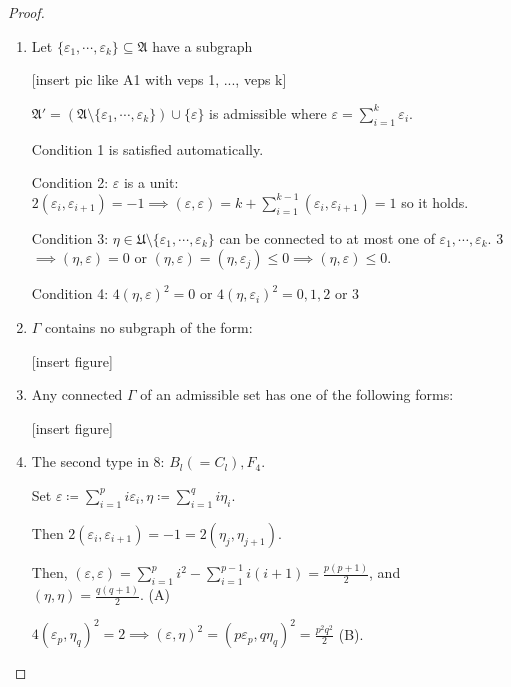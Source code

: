 \documentclass{article}
\theoremstyle{definition}
\begin{document}
\begin{proof}
\begin{enumerate}[label=\arabic*)]
        \item Let \(\{ \varepsilon_1, \cdots , \varepsilon_k \} \subseteq \mathfrak{A}\) have a subgraph
            
        [insert pic like A1 with veps 1, ..., veps k]

        \(\mathfrak{A}'= (\mathfrak{A} \setminus \{ \varepsilon_1, \cdots , \varepsilon_k \}) \cup \{ \varepsilon \}\) is admissible where \(\varepsilon = \sum_{i=1}^k \varepsilon_i\). 
            
        Condition 1 is satisfied automatically.

        Condition 2: \(\varepsilon\) is a unit: \(2 (\varepsilon_i, \varepsilon_{i+1}) = -1 \implies (\varepsilon , \varepsilon) = k + \sum_{i=1}^{k-1} (\varepsilon_i, \varepsilon_{i+1}) = 1\) so it holds.
            
        Condition 3: \(\eta \in \mathfrak{U} \setminus \{ \varepsilon_1, \cdots , \varepsilon_k \} \) can be connected to at most one of \(\varepsilon_1, \cdots , \varepsilon_k\). 3 \(\implies (\eta, \varepsilon) = 0\) or \((\eta, \varepsilon) = (\eta, \varepsilon_j) \leq 0 \implies (\eta, \varepsilon) \leq 0\).

        Condition 4: \(4(\eta,\varepsilon)^2 = 0\) or \(4(\eta, \varepsilon_i)^2 = 0,1,2\) or \(3\)
            
        
    \item \(\Gamma\) contains no subgraph of the form:
        
    [insert figure]

    \item Any connected \(\Gamma\) of an admissible set has one of the following forms:
        
    [insert figure]

    \item The second type in 8: \(B_l(= C_l), F_4\).
    
    Set \(\varepsilon \coloneqq \sum_{i=1}^p i \varepsilon_i, \eta \coloneqq \sum_{i=1}^q i \eta_i\).

    Then \(2 (\varepsilon_i, \varepsilon_{i+1}) = -1 = 2(\eta_j, \eta_{j+1})\).
    
    Then, \((\varepsilon , \varepsilon) = \sum_{i=1}^p i^2 - \sum_{i=1}^{p-1} i(i+1) = \frac{p(p+1)}{2}\), and \((\eta, \eta) = \frac{q(q+1)}{2}\). (A)

    \(4(\varepsilon_p, \eta_q)^2 = 2 \implies (\varepsilon, \eta)^2 = (p \varepsilon_p, q \eta_q)^2 = \frac{p^2 q^2}{2}\) (B).


\end{enumerate}
\end{proof}
\end{document}
